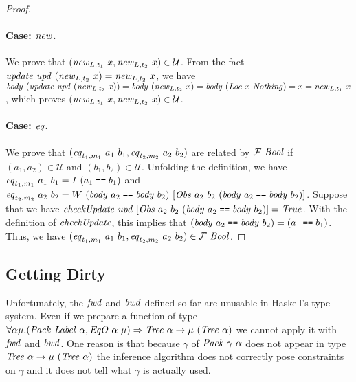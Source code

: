 \documentclass{article}
\theoremstyle{definition}
\newcommand{\texteq}{\mathrel{\texttt{==}}}
\begin{document}
\begin{proof}

\paragraph{Case: $\mathit{new}$.}
We prove that $(\mathit{new}_{L,t_1}~x,\mathit{new}_{L,t_2}~x) \in \mathcal{U}$.
From the fact 
 $\mathit{update}~\mathit{upd}~(\mathit{new}_{L,t_2}~x) = \mathit{new}_{L,t_2}~x$, we
have $\mathit{body}~(\mathit{update}~\mathit{upd}~(\mathit{new}_{L,t_2}~x)) = 
\mathit{body}~(\mathit{new}_{L,t_2}~x) = \mathit{body}~(\mathit{Loc}~x~\mathit{Nothing}) = x = \mathit{new}_{L,t_1}~x$, which proves $(\mathit{new}_{L,t_1}~x,\mathit{new}_{L,t_2}~x) \in \mathcal{U}$.


\paragraph{Case: $\mathit{eq}$.}
We prove that $(\mathit{eq}_{t_1,m_1}~a_1~b_1, \mathit{eq}_{t_2,m_2}~a_2~b_2)$
are related by $\mathcal{F}~\mathit{Bool}$ if $(a_1,a_2) \in \mathcal{U}$
and $(b_1,b_2) \in \mathcal{U}$.
Unfolding the definition, we have $\mi{eq}_{t_1,m_1}~a_1~b_1 = I~(a_1 \texteq b_1)$
 and $\mi{eq}_{t_2,m_2}~a_2~b_2 = W~
(\mi{body}~a_2 \texteq
\mi{body}~b_2)~
[\mi{Obs}~a_2~b_2~(\mi{body}~a_2 \texteq
\mi{body}~b_2)]$. 
Suppose that we have $\mi{checkUpdate}~\mi{upd}~[\mi{Obs}~a_2~b_2~(\mi{body}~a_2 \texteq
\mi{body}~b_2)] =\mi{True}$. With the definition of $\mathit{checkUpdate}$, 
this implies that $(\mi{body}~a_2 \texteq
\mi{body}~b_2) = (a_1 \texteq b_1)$. Thus, we have 
$(\mathit{eq}_{t_1,m_1}~a_1~b_1, \mathit{eq}_{t_2,m_2}~a_2~b_2) \in \mathcal{F}~\mathit{Bool}$.
\end{proof}

\subsection{Getting Dirty}
Unfortunately, the $\mathit{fwd}$ and $\mathit{bwd}$ defined so far are unusable in 
Haskell's type system. Even if we prepare a function of type 
$\forall \alpha \mu. (\mathit{Pack}~\mathit{Label}~\alpha, \mathit{EqO}~\alpha~\mu) \Rightarrow \mathit{Tree}~\alpha \to \mu~(\mathit{Tree}~\alpha)$ we cannot apply it with $\mathit{fwd}$ and $\mathit{bwd}$. One reason is that 
because $\gamma$ of $\mathit{Pack}~\gamma~\alpha$ does not appear in type 
$\mathit{Tree}~\alpha \to \mu~(\mathit{Tree}~\alpha)$ the inference algorithm does not 
correctly pose constraints on $\gamma$ and it does not tell what $\gamma$ is actually used. 
\end{document}
